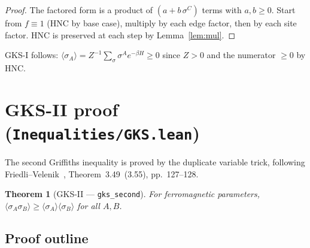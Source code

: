 \documentclass[a4paper,11pt]{article}
\newtheorem{theorem}{Theorem}
\begin{document}
\begin{proof}
The factored form is a product of $(a+b\,\sigma^C)$ terms with
$a,b \geq 0$. Start from $f \equiv 1$ (HNC by base case),
multiply by each edge factor, then by each site factor. HNC is
preserved at each step by Lemma~\ref{lem:mul}.
\end{proof}

\noindent
GKS-I follows: $\langle \sigma_A \rangle
= Z^{-1}\sum_\sigma \sigma^A e^{-\beta H} \geq 0$
since $Z > 0$ and the numerator $\geq 0$ by HNC.

\section{GKS-II proof (\texttt{Inequalities/GKS.lean})}

The second Griffiths inequality is proved by the duplicate variable trick,
following Friedli--Velenik~\cite{friedli-velenik}, Theorem~3.49~(3.55),
pp.~127--128.

\begin{theorem}[GKS-II --- \texttt{gks\_second}]
For ferromagnetic parameters,
$\langle\sigma_A\sigma_B\rangle \geq \langle\sigma_A\rangle\langle\sigma_B\rangle$
for all $A, B$.
\end{theorem}

\subsection{Proof outline}
\end{document}
